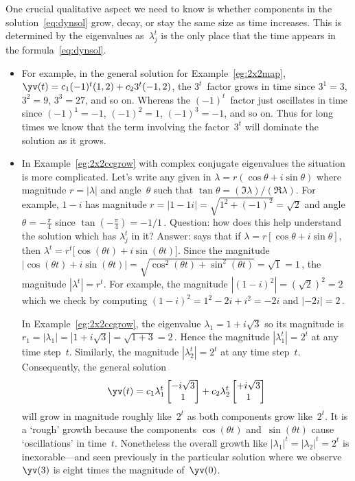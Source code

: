 One crucial qualitative aspect we need to know is whether components in the solution~\eqref{eq:dynsol} grow, decay, or stay the same size as time increases.
This is determined by the eigenvalues as~\(\lambda_j^t\) is the only place that the time appears in the formula~\eqref{eq:dynsol}.
\begin{itemize}
\item For example, in the general solution for Example~\ref{eg:2x2map}, \(\yv(t)=c_1(-1)^t(1,2)+c_23^t(-1,2)\), the \(3^t\)~factor grows in time since \(3^1=3\), \(3^2=9\), \(3^3=27\), and so on.
Whereas the \((-1)^t\)~factor just oscillates in time since \((-1)^1=-1\), \((-1)^2=1\), \((-1)^3=-1\), and so on.
Thus for long times we know that the term involving the factor~\(3^t\) will dominate the solution as it grows.

\item In Example~\ref{eg:2x2ccgrow} with complex conjugate eigenvalues the situation is more complicated.
Let's write any given  in  
\(\lambda=r(\cos\theta+i\sin\theta)\) where magnitude \(r=|\lambda|\) and angle~\(\theta\) such that \(\tan\theta=(\Im\lambda)/(\Re\lambda)\).
For example, \(1-i\) has magnitude \(r=|1-1i|=\sqrt{1^2+(-1)^2}=\sqrt2\) and angle \(\theta=-\frac\pi4\) since \(\tan(-\frac\pi4)=-1/1\)\,.
Question: how does this help understand the solution which has \(\lambda_j^t\) in it?
Answer:  says that if \(\lambda=r[\cos\theta+i\sin\theta]\), then \(\lambda^t=r^t\big[\cos(\theta t)+i\sin(\theta t)\big]\).
Since the magnitude \(|\cos(\theta t)+i\sin(\theta t)|=\sqrt{\cos^2(\theta t)+\sin^2(\theta t)}=\sqrt1=1\)\,, the magnitude \(|\lambda^t|=r^t\).
For example, the magnitude \(|(1-i)^2|=(\sqrt2)^2=2\) which we check by computing \((1-i)^2=1^2-2i+i^2=-2i\) and \(|-2i|=2\)\,.

In Example~\ref{eg:2x2ccgrow}, the eigenvalue \(\lambda_1=1+i\sqrt3\) so its magnitude is \(r_1=|\lambda_1|=|1+i\sqrt3|=\sqrt{1+3}=2\)\,.
Hence the magnitude \(|\lambda_1^t|=2^t\) at any time step~\(t\).
Similarly, the magnitude \(|\lambda_2^t|=2^t\) at any time step~\(t\).
Consequently, the general solution
\begin{equation*}
\yv(t)=c_1\lambda_1^t\begin{bmatrix} -i\sqrt3\\1 \end{bmatrix}
+c_2\lambda_2^t\begin{bmatrix} +i\sqrt3\\1 \end{bmatrix}
\end{equation*}
will grow in magnitude roughly like~\(2^t\) as both components grow like~\(2^t\).
It is a `rough' growth because the components \(\cos(\theta t)\) and~\(\sin(\theta t)\)  cause `oscillations' in time~\(t\).
Nonetheless the overall growth like \(|\lambda_1|^t=|\lambda_2|^t=2^t\) is inexorable---and seen previously in the particular solution where we observe \(\yv(3)\) is eight times the magnitude of~\(\yv(0)\).
\end{itemize}
